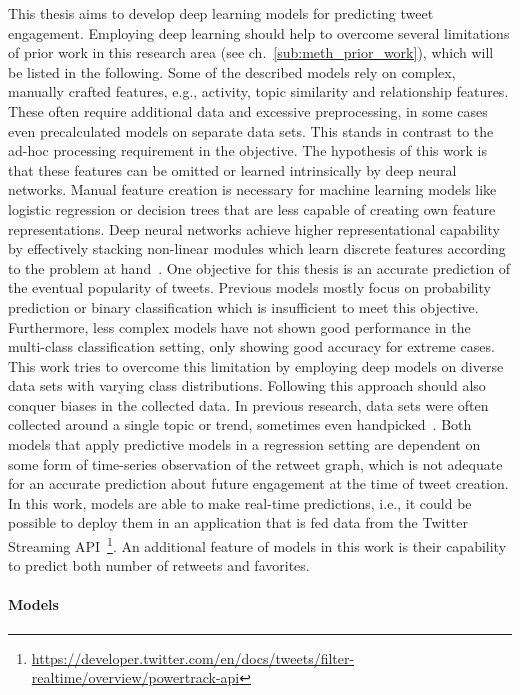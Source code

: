 This thesis aims to develop deep learning models for predicting tweet
engagement.
Employing deep learning should help to overcome several limitations of prior
work in this research area (see ch.~\ref{sub:meth_prior_work}), which will be listed in the following.
Some of the described models rely on complex, manually crafted features, e.g.,
activity, topic similarity and relationship features.
These often require additional data and excessive preprocessing, in some cases
even precalculated models on separate data sets.
This stands in contrast to the ad-hoc processing requirement in the objective.
The hypothesis of this work is that these features can be omitted or
learned intrinsically by deep neural networks.
Manual feature creation is necessary for machine learning models like logistic
regression or decision trees that are less capable of creating own feature
representations.
Deep neural networks achieve higher representational capability by effectively
stacking non-linear modules which learn discrete features according to the problem at
hand~\cite{LeCun2015}.
One objective for this thesis is an accurate prediction of the eventual popularity
of tweets.
Previous models mostly focus on probability prediction or binary classification
which is insufficient to meet this objective.
Furthermore, less complex models have not shown good performance in the multi-class
classification setting, only showing good accuracy for extreme cases.
This work tries to overcome this limitation by employing deep models on diverse
data sets with varying class distributions.
Following this approach should also conquer biases in the collected data.
In previous research, data sets were often collected around a single topic or
trend, sometimes even handpicked~\cite{Zaman2014}.
Both models that apply predictive models in a regression setting are dependent
on some form of time-series observation of the retweet graph, which is not adequate for
an accurate prediction about future engagement at the time of tweet creation.
In this work, models are able to make real-time predictions, i.e., it could
be possible to deploy them in an application that is fed data from the Twitter
Streaming API~\footnote{\url{https://developer.twitter.com/en/docs/tweets/filter-realtime/overview/powertrack-api}}.
An additional feature of models in this work is their capability to predict both
number of retweets and favorites.

\paragraph{Models}

